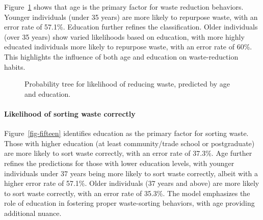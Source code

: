 \documentclass[
  letterpaper,
  DIV=11,
  numbers=noendperiod]{scrartcl}
\let\oldparagraph\paragraph
\renewcommand{\paragraph}[1]{\oldparagraph{#1}\mbox{}}
\begin{document}
Figure~\ref{fig-fourteen} shows that age is the primary factor for waste
reduction behaviors. Younger individuals (under 35 years) are more
likely to repurpose waste, with an error rate of 57.1\%. Education
further refines the classification. Older individuals (over 35 years)
show varied likelihoods based on education, with more highly educated
individuals more likely to repurpose waste, with an error rate of 60\%.
This highlights the influence of both age and education on
waste-reduction habits.

\begin{figure}


\caption{\label{fig-fourteen}Probability tree for likelihood of reducing
waste, predicted by age and education.}

\end{figure}%

\paragraph{Likelihood of sorting waste
correctly}\label{likelihood-of-sorting-waste-correctly}

Figure~\ref{fig-fifteen} identifies education as the primary factor for
sorting waste. Those with higher education (at least community/trade
school or postgraduate) are more likely to sort waste correctly, with an
error rate of 37.3\%. Age further refines the predictions for those with
lower education levels, with younger individuals under 37 years being
more likely to sort waste correctly, albeit with a higher error rate of
57.1\%. Older individuals (37 years and above) are more likely to sort
waste correctly, with an error rate of 35.3\%. The model emphasizes the
role of education in fostering proper waste-sorting behaviors, with age
providing additional nuance.
\end{document}
